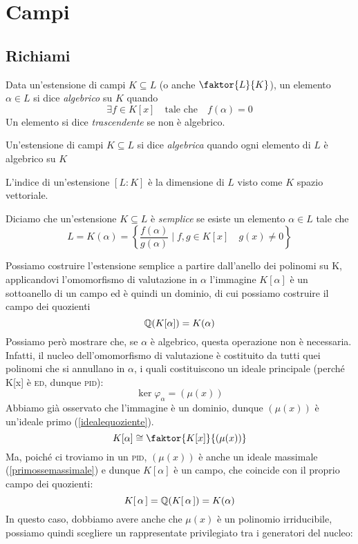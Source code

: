 \setcounter{section}{10} %
\section{Campi}

\subsection{Richiami}
\begin{multicols}{2}

\begin{definition}
	Data un'estensione di campi $ K \subseteq L $ (o anche $ \faktor{L}{K} $), un elemento $ \alpha \in L $ si dice \emph{algebrico} su $ K $ quando 
	\[ \exists f \in K[x] \quad \text{tale che} \quad f(\alpha) = 0 \]
	Un elemento si dice \emph{trascendente} se non è algebrico.
\end{definition}

\begin{definition}
	Un'estensione di campi $ K \subseteq L $ si dice \emph{algebrica} quando ogni elemento di $ L $ è algebrico su $ K $
\end{definition}

\begin{definition}
	L'indice di un'estensione $ [L:K] $ è la dimensione di $ L $ visto come $ K $ spazio vettoriale.
\end{definition}

\begin{definition}
	Diciamo che un'estensione $ K \subseteq L $ è \emph{semplice} se esiste un elemento $ \alpha \in L $ tale che
	\[ L = K(\alpha) = \left\{ \frac{f(\alpha)}{g(\alpha)} \mid f, g \in K[x] \quad g(x) \neq 0  \right\} \]
\end{definition}

Possiamo costruire l'estensione semplice a partire dall'anello dei polinomi su K, applicandovi l'omomorfismo di valutazione in $ \alpha $
l'immagine $ K[\alpha] $ è un sottoanello di un campo ed è quindi un dominio, di cui possiamo costruire il campo dei quozienti
\[ \mathbb{Q}(K[\alpha]) = K(\alpha) \]
Possiamo però mostrare che, se $ \alpha $ è algebrico, questa operazione non è necessaria. Infatti, il nucleo dell'omomorfismo di valutazione è costituito da tutti quei polinomi che si annullano in $ \alpha $, i quali costituiscono un ideale principale (perché K[x] è \textsc{ed}, dunque \textsc{pid}):
\[ \ker\varphi_\alpha = (\mu(x)) \]
Abbiamo già osservato che  l'immagine è un dominio, dunque $ (\mu(x)) $ è un'ideale primo (\ref{idealequoziente}).
\[ K[\alpha] \cong \faktor{K[x]}{(\mu(x))} \]
Ma, poiché ci troviamo in un \textsc{pid}, $ (\mu(x)) $ è anche un ideale massimale (\ref{primossemassimale}) e dunque $ K[\alpha] $ è un campo, che coincide con il proprio campo dei quozienti:
\[ K[\,\alpha\,] = \mathbb{Q}(K[\,\alpha\,]) = K(\alpha) \]
In questo caso, dobbiamo avere anche che $ \mu(x) $ è un polinomio irriducibile, possiamo quindi scegliere un rappresentate privilegiato tra i generatori del nucleo:


\end{multicols}
